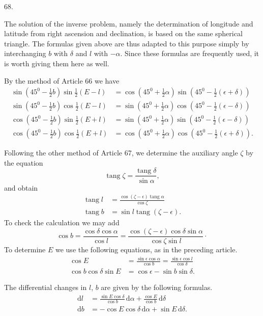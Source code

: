 \par{}\medskip
\hypertarget{native-087-article068}{}
\begin{center}68.\end{center}
The solution of the inverse problem, namely the determination of longitude and latitude from right ascension and declination, is based on the same spherical triangle. The formulas given above are thus adapted to this purpose simply by interchanging $b$ with $\delta$ and $l$ with $-\alpha$. Since these formulas are frequently used, it is worth giving them here as well.

By the method of Article 66 we have
\[
\begin{aligned}
\sin(45^0-\tfrac12 b)\sin\tfrac12(E-l)&=\cos(45^0+\tfrac12\alpha)\sin(45^0-\tfrac12(\epsilon+\delta))\\[.5em]
\sin(45^0-\tfrac12 b)\cos\tfrac12(E-l)&=\sin(45^0+\tfrac12\alpha)\cos(45^0-\tfrac12(\epsilon-\delta))\\[.5em]
\cos(45^0-\tfrac12 b)\sin\tfrac12(E+l)&=\sin(45^0+\tfrac12\alpha)\sin(45^0-\tfrac12(\epsilon-\delta))\\[.5em]
\cos(45^0-\tfrac12 b)\cos\tfrac12(E+l)&=\cos(45^0+\tfrac12\alpha)\cos(45^0-\tfrac12(\epsilon+\delta)).
\end{aligned}
\]

Following the other method of Article 67, we determine the auxiliary angle $\zeta$ by the equation
\[
\operatorname{tang}\zeta=\frac{\operatorname{tang}\delta}{\sin\alpha},
\]
\noindent and obtain
\[
\begin{aligned}
\operatorname{tang}l&=\frac{\cos(\zeta-\epsilon)\operatorname{tang}\alpha}{\cos\zeta}\\[.5em]
\operatorname{tang}b&=\sin l\operatorname{tang}(\zeta-\epsilon).
\end{aligned}
\]
\noindent To check the calculation we may add
\[
\cos b=\frac{\cos\delta\cos\alpha}{\cos l}=\frac{\cos(\zeta-\epsilon)\cos\delta\sin\alpha}{\cos\zeta\sin l}\cdot
\]
\noindent To determine $E$ we use the following equations, as in the preceding article.
\[
\begin{aligned}
\cos E&=\frac{\sin\epsilon\cos\alpha}{\cos b}=\frac{\sin\epsilon\cos l}{\cos\delta}\\[.5em]
\cos b\cos\delta\sin E&=\cos\epsilon-\sin b\sin\delta.
\end{aligned}
\]

The differential changes in $l$, $b$ are given by the following formulas.
\[
\begin{aligned}
\mathrm{d}l&=\frac{\sin E\cos\delta}{\cos b}\,\mathrm{d}\alpha+\frac{\cos E}{\cos b}\,\mathrm{d}\delta\\[.5em]
\mathrm{d}b&=-\cos E\cos\delta\,\mathrm{d}\alpha+\sin E\,\mathrm{d}\delta.
\end{aligned}
\]
